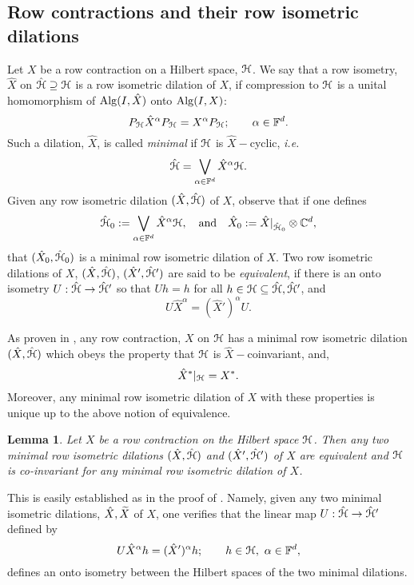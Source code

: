 \documentclass[11pt]{article}
\newcommand{\mr}{\ensuremath{\mathrm}}
\newcommand{\mc}{\ensuremath{\mathcal}}
\newcommand{\wt}{\ensuremath{\widetilde}}
\def\C{\mathbb{C}}
\renewcommand{\H}{\ensuremath{\mathcal{H} }}
\newcommand{\F}{\ensuremath{\mathbb{F} }}
\numberwithin{equation}{section}
\numberwithin{subsection}{section}
\newtheorem{lemma}[subsection]{Lemma}
\theoremstyle{definition}
\begin{document}
\subsection{Row contractions and their row isometric dilations}

\label{minimal}

Let $X$ be a row contraction on a Hilbert space, $\mc{H}$.  We say that a row isometry, $\hat{X}$ on $\hat{\mc{H}} \supseteq \mc{H}$ is a row isometric dilation of $X$, if compression to $\mc{H}$ is a unital homomorphism of $\mr{Alg} (I , \hat{X} )$ onto $\mr{Alg} (I, X)$:
$$ P_\mc{H} \hat{X} ^\alpha P_{\mc{H}} = X ^\alpha P _{\mc{H}}; \quad \quad \alpha \in \F ^d. $$ 
Such a dilation, $\hat{X}$, is called \emph{minimal} if $\mc{H}$ is $\hat{X}-$cyclic, \emph{i.e.} 
$$ \hat{\mc{H}} = \bigvee _{\alpha \in \F ^d} \hat{X} ^\alpha \mc{H}. $$  Given any row isometric dilation $(\hat{X}, \hat{\mc{H}} )$ of $X$, observe that if one defines
$$ \hat{\mc{H}}_0 := \bigvee _{\alpha \in \F ^d} \hat{X} ^\alpha \mc{H}, \quad \mbox{and} \quad 
\hat{X} _0 := \hat{X} | _{\hat{\mc{H}} _0 } \otimes \C ^d, $$ that $( \hat{X} _0, \hat{\mc{H}} _0 )$ is a minimal row isometric dilation of $X$. Two row isometric dilations of $X$, $(\hat{X}, \hat{\mc{H}})$, $(\hat{X} ' , \hat{\mc{H}} ' )$ are said to be \emph{equivalent}, if there is an onto isometry $U : \hat{\mc{H}} \rightarrow \hat{\mc{H}} '$ so that $Uh =h$ for all $h \in \H \subseteq \hat{\mc{H}}, \hat{\mc{H}} ' $, and 
$$ U \hat{X} ^\alpha = (\hat{X} ') ^\alpha U. $$ 

As proven in \cite[Theorem 2.1]{Pop-dil}, any row contraction, $X$ on $\mc{H}$ has a minimal row isometric dilation $(\hat{X}, \hat{\mc{H}} )$ which obeys the property that $\mc{H}$ is $\hat{X}-$coinvariant, and,
$$ \hat{X} ^* | _{\mc{H}} = X ^*. $$ Moreover, any minimal row isometric dilation of $X$ with these properties is unique up to the above notion of equivalence. 

\begin{lemma} \label{minunique}
Let $X$ be a row contraction on the Hilbert space $\mc{H}$. Then any two minimal row isometric dilations $(\hat{X} , \hat{\mc{H}})$ and $(\hat{X} ' , \hat{\mc{H}} ' )$ of $X$ are equivalent and $\mc{H}$ is co-invariant for any minimal row isometric dilation of $X$.
\end{lemma}
This is easily established as in the proof of \cite[Chapter 4,Theorem 4.1]{NF}. Namely, given any two minimal isometric dilations, $\hat{X}, \wt{X}$ of $X$, one verifies that the linear map
$U :\hat{\mc{H}} \rightarrow \hat{\mc{H}} '$ defined by
$$ U \hat{X} ^\alpha h = (\hat{X} ') ^\alpha h; \quad \quad h \in \mc{H}, \ \alpha \in \F^d, $$ defines an onto isometry between the Hilbert spaces of the two minimal dilations.
\end{document}
